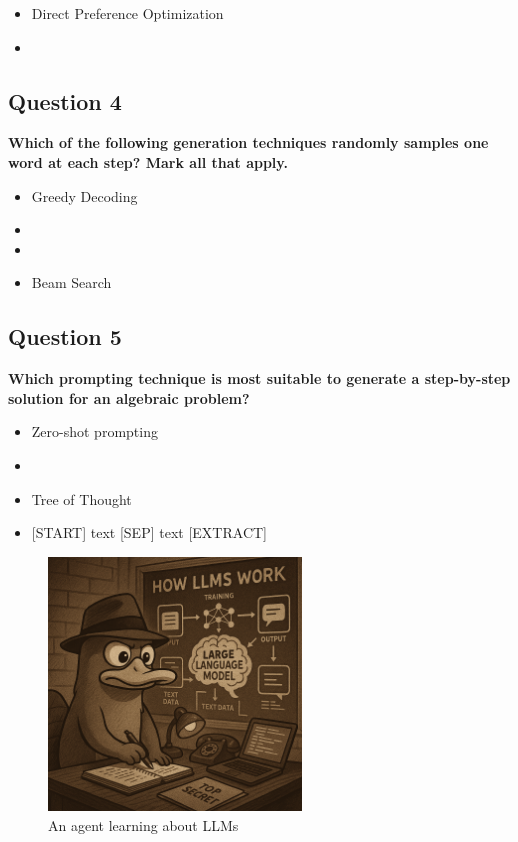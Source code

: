 \begin{itemize}
    \item Direct Preference Optimization
    \item {}
\end{itemize}



\subsection{Question 4}
\label{subsec:q4}
\textbf{Which of the following generation techniques randomly samples one word at each step?
Mark all that apply.}

\begin{itemize}
    \item Greedy Decoding
    \item {}
    \item {}
    \item Beam Search
\end{itemize}


\subsection{Question 5}
\label{subsec:q5}
\textbf{Which prompting technique is most suitable to generate a step-by-step solution for
an algebraic problem?}

\begin{itemize}
    \item Zero-shot prompting
    \item {}
    \item Tree of Thought
    \item {[}START{]} text {[}SEP{]} text {[}EXTRACT{]}
\end{itemize}


\vspace{2cm}

\begin{figure}[h]
    \centering
    \includegraphics[width=0.6\textwidth]{agentp}
    \caption{An agent learning about LLMs}
    \label{fig:agentp}
\end{figure}
